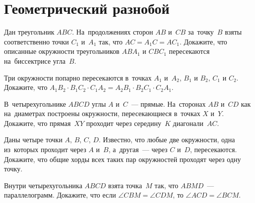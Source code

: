 
\section*{Геометрический разнобой}


\begin{problems}

\item
Дан треугольник $ABC$.
На~продолжениях сторон $AB$ и~$CB$ за~точку~$B$ взяты соответственно точки
$C_1$ и~$A_1$ так, что $AC = A_1 C = A C_1$.
Докажите, что описанные окружности треугольников $A B A_1$ и $C B C_1$
пересекаются на~биссектрисе угла~$B$.

\item
Три окружности попарно пересекаются в~точках
$A_1$ и~$A_2$, $B_1$ и $B_2$, $C_1$ и $C_2$.
Докажите, что
$A_1 B_2 \cdot B_1 C_2 \cdot C_1 A_2 = A_2 B_1 \cdot B_2 C_1 \cdot C_2 A_1$.

\item
В~четырехугольнике $ABCD$ углы $A$ и~$C$~--- прямые.
На~сторонах $AB$ и~$CD$ как на~диаметрах построены окружности, пересекающиеся
в~точках $X$ и~$Y$.
Докажите, что прямая~$XY$ проходит через середину~$K$ диагонали~$AC$.

\item
Даны четыре точки $A$, $B$, $C$, $D$.
Известно, что любые две окружности, одна из~которых проходит через $A$ и~$B$,
а~другая~--- через $C$ и~$D$, пересекаются.
Докажите, что общие хорды всех таких пар окружностей проходят через одну точку.

\item
Внутри четырехугольника $ABCD$ взята точка~$M$ так, что $ABMD$~---
параллелограмм.
Докажите, что если $\angle CBM = \angle CDM$, то $ \angle ACD = \angle BCM$.

\end{problems}

